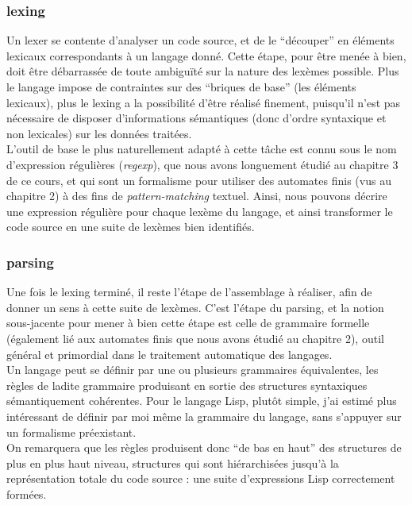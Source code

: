 \documentclass{article}
\begin{document}
\subsubsection{lexing}
Un lexer se contente d'analyser un code source, et de le ``découper'' en éléments lexicaux
correspondants à un langage donné. Cette étape, pour être menée à bien, doit être débarrassée de
toute ambiguïté sur la nature des lexèmes possible. Plus le langage impose de contraintes sur des
``briques de base'' (les éléments lexicaux), plus le lexing a la possibilité d'être réalisé finement,
puisqu'il n'est pas nécessaire de disposer d'informations sémantiques (donc d'ordre syntaxique et
non lexicales) sur les données traitées.
\\
L'outil de base le plus naturellement adapté à cette tâche est connu sous le nom d'expression
régulières (\emph{regexp}), que nous avons longuement étudié au chapitre 3 de ce cours, et qui sont un
formalisme pour utiliser des automates finis (vus au chapitre 2) à des fins de \emph{pattern-matching}
textuel. Ainsi, nous pouvons décrire une expression régulière pour chaque lexème du langage, et
ainsi transformer le code source en une suite de lexèmes bien identifiés.
\subsubsection{parsing}
Une fois le lexing terminé, il reste l'étape de l'assemblage à réaliser, afin de donner un sens à cette
suite de lexèmes. C'est l'étape du parsing, et la notion sous-jacente pour mener à bien cette étape est
celle de grammaire formelle (également lié aux automates finis que nous avons étudié au chapitre
2), outil général et primordial dans le traitement automatique des langages.
\\
Un langage peut se définir par une ou plusieurs grammaires équivalentes, les règles de ladite
grammaire produisant en sortie des structures syntaxiques sémantiquement cohérentes.
Pour le langage Lisp, plutôt simple, j'ai estimé plus intéressant de définir par moi même la
grammaire du langage, sans s'appuyer sur un formalisme préexistant.
\\
On remarquera que les règles produisent donc ``de bas en haut'' des structures de plus en plus haut
niveau, structures qui sont hiérarchisées jusqu'à la représentation totale du code source : une suite
d'expressions Lisp correctement formées.
\end{document}
